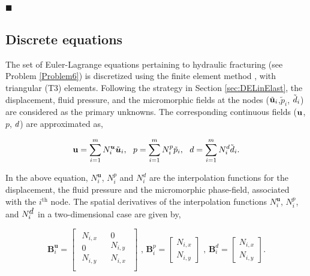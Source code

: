 \documentclass[11pt]{article}
\begin{document}
\begin{vproblem}
{\color{black}\hfill $\blacksquare$}
\end{vproblem}


\subsection{Discrete equations}\label{sec:DEPorous}

The set of Euler-Lagrange equations pertaining to hydraulic fracturing (see Problem \ref{Problem6}) is discretized using the finite element method \cite{zienkiewicz1977finite,hughes2012finite}, with triangular (T3) elements. Following the strategy in Section \ref{sec:DELinElast}, the displacement, fluid pressure, and the micromorphic fields at the nodes ($\tilde{\hbox{$\mathbf{u}$}}_i$,$\tilde{p}_i$, $\tilde{\hbox{$d$}}_i$) are considered as the primary unknowns. The corresponding continuous fields ($\hbox{$\mathbf{u}$}$, $p$, $\hbox{$d$}$) are approximated as,  

\begin{equation}\label{eqn:discrete_disp_mpf2}
  \hbox{$\mathbf{u}$} = \sum\limits_{i = 1}^m {N_i^{\boldsymbol{u}}\tilde{\boldsymbol{u}}_i,}\;\;\;
  p = \sum\limits_{i = 1}^m {N_i^{p}\tilde{p}_i,}\;\;\;
\hbox{$d$} = \sum\limits_{i = 1}^m N_i^{d}\tilde{\hbox{$d$}}_i.
\end{equation}

\noindent In the above equation, $N_i^{\boldsymbol{u}}$, $N_i^{p}$ and $N_i^{d}$ are the interpolation functions for the displacement, the fluid pressure and the micromorphic phase-field, associated with the $i^{\text{th}}$ node. The spatial derivatives of the interpolation functions $N_i^{\boldsymbol{u}}$, $N_i^{p}$, and $N_i^{\hbox{$d$}}$ in a two-dimensional case are given by,

\begin{equation}\label{eqn:Bmatrices2}
    \mathbf{B}_i^{\boldsymbol{u}} = \left[ {\begin{array}{*{20}{c}}
  {\begin{array}{*{20}{c}}
  {{N_{i,x}}} \\ 
  0 \\ 
  {{N_{i,y}}}\\
\end{array}}&{\begin{array}{*{20}{c}}
  0 \\ 
  {{N_{i,y}}} \\ 
  {{N_{i,x}}} \\
\end{array}}
\end{array}} \right] \text{ , } 
\mathbf{B}_i^{p}  = \left[ {\begin{array}{*{20}{c}}
  {{N_{i,x}}} \\ 
  {{N_{i,y}}}
\end{array}} \right] \text{ , }  
\mathbf{B}_i^{d}  = \left[ {\begin{array}{*{20}{c}}
  {{N_{i,x}}} \\ 
  {{N_{i,y}}}
\end{array}} \right].
\end{equation}
\end{document}
